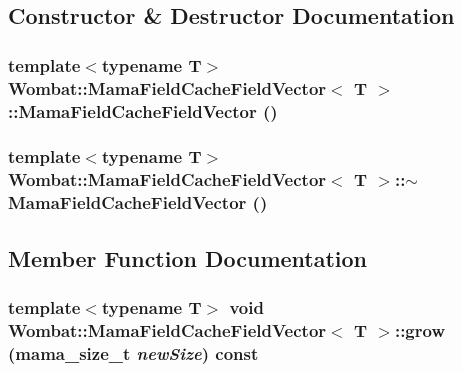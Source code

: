 \subsection{Constructor \& Destructor Documentation}
\hypertarget{classWombat_1_1MamaFieldCacheFieldVector_a2078738f000e28ec40f2e8390df3f8a0}{
\subsubsection[{MamaFieldCacheFieldVector}]{\setlength{\rightskip}{0pt plus 5cm}template$<$typename T$>$ {\bf Wombat::MamaFieldCacheFieldVector}$<$ T $>$::{\bf MamaFieldCacheFieldVector} ()}}
\label{classWombat_1_1MamaFieldCacheFieldVector_a2078738f000e28ec40f2e8390df3f8a0}
\hypertarget{classWombat_1_1MamaFieldCacheFieldVector_a74140cb13097ad032a0bb43d088421a2}{
\subsubsection[{$\sim$MamaFieldCacheFieldVector}]{\setlength{\rightskip}{0pt plus 5cm}template$<$typename T$>$ {\bf Wombat::MamaFieldCacheFieldVector}$<$ T $>$::$\sim${\bf MamaFieldCacheFieldVector} ()}}
\label{classWombat_1_1MamaFieldCacheFieldVector_a74140cb13097ad032a0bb43d088421a2}


\subsection{Member Function Documentation}
\hypertarget{classWombat_1_1MamaFieldCacheFieldVector_a78c5f414cc9913b2dd0ad4ecfdca9310}{
\subsubsection[{grow}]{\setlength{\rightskip}{0pt plus 5cm}template$<$typename T$>$ void {\bf Wombat::MamaFieldCacheFieldVector}$<$ T $>$::grow ({\bf mama\_\-size\_\-t} {\em newSize}) const}}
\label{classWombat_1_1MamaFieldCacheFieldVector_a78c5f414cc9913b2dd0ad4ecfdca9310}


